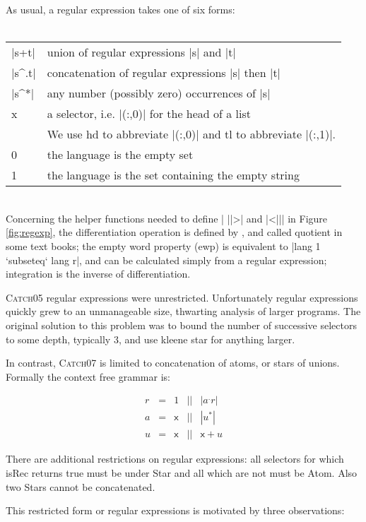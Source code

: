 \documentclass[preprint]{sigplanconf}
\newcommand{\C}[1]{\textsf{#1}}
\newcommand{\catch}{\textsc{Catch}}
\begin{document}
As usual, a regular expression takes one of six forms:\\ \\
\begin{tabular}{ll}
|s+t|  & union of regular expressions |s| and |t| \\
|s^.t| & concatenation of regular expressions |s| then |t| \\
|s^*|  & any number (possibly zero) occurrences of |s| \\
\C{x}  & a selector, i.e. |(:,0)| for the head of a list \\
       & We use \C{hd} to abbreviate |(:,0)| and \C{tl} to abbreviate |(:,1)|. \\
0      & the language is the empty set \\
1      & the language is the set containing the empty string
\end{tabular} \\

Concerning the helper functions needed to define | ||>| and |<||| in Figure \ref{fig:regexp}, the differentiation operation is defined by \citet{conway:regexp}, and called quotient in some text books; the empty word property (\C{ewp}) is equivalent to |lang 1 `subseteq` lang r|, and can be calculated simply from a regular expression; integration is the inverse of differentiation.

\catch05 regular expressions were unrestricted. Unfortunately regular expressions quickly grew to an unmanageable size, thwarting analysis of larger programs. The original solution to this problem was to bound the number of successive selectors to some depth, typically 3, and use kleene star for anything larger.

In contrast, \catch07 is limited to concatenation of atoms, or stars of unions. Formally the context free grammar is:

\[\begin{array}{lllll}
r & = & 1     & || & |a^.r| \\
a & = & \C{x} & || & |u^*| \\
u & = & \C{x} & || & \C{x} + u
\end{array}\]

There are additional restrictions on regular expressions: all selectors for which \C{isRec} returns true must be under \C{Star} and all which are not must be \C{Atom}. Also two \C{Star}s cannot be concatenated.

This restricted form or regular expressions is motivated by three observations:
\end{document}
